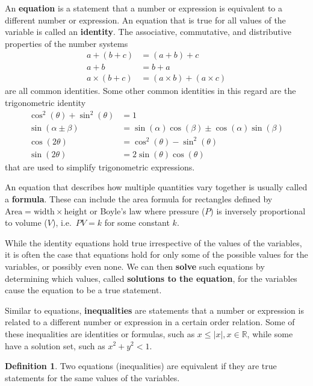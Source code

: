 \documentclass[
]{book}
\theoremstyle{definition}
\newtheorem{definition}{Definition}[chapter]
\theoremstyle{definition}
\theoremstyle{definition}
\theoremstyle{definition}
\theoremstyle{remark}
\begin{document}
An \textbf{equation} is a statement that a number or expression is equivalent to a different number or expression. An equation that is true for all values of the variable is called an \textbf{identity}. The associative, commutative, and distributive properties of the number systems
\begin{align*}
    a+(b+c) &= (a+b)+c \\
    a+b &= b+a \\
    a \times (b+c) &= (a\times b)+(a\times c)
\end{align*}
are all common identities. Some other common identities in this regard are the trigonometric identity
\begin{align*}
    \cos^2(\theta) + \sin^2(\theta) &= 1  \\
    \sin(\alpha \pm \beta) &= \sin(\alpha)\cos(\beta)\pm \cos(\alpha)\sin(\beta) \\
    \cos(2\theta) &= \cos^2(\theta)-\sin^2(\theta) \\
    \sin(2 \theta) &= 2 \sin(\theta)\cos(\theta)
\end{align*}
that are used to simplify trigonometric expressions.

An equation that describes how multiple quantities vary together is usually called a \textbf{formula}. These can include the area formula for rectangles defined by \(\mbox{Area}=\mbox{width} \times \mbox{height}\) or Boyle's law where pressure (\(P\)) is inversely proportional to volume (\(V\)), i.e.~\(PV =k\) for some constant \(k\).

While the identity equations hold true irrespective of the values of the variables, it is often the case that equations hold for only some of the possible values for the variables, or possibly even none. We can then \textbf{solve} such equations by determining which values, called \textbf{solutions to the equation}, for the variables cause the equation to be a true statement.

Similar to equations, \textbf{inequalities} are statements that a number or expression is related to a different number or expression in a certain order relation. Some of these inequalities are identities or formulas, such as \(x\leq |x|, x\in\mathbb{R}\), while some have a solution set, such as \(x^2+y^2<1\).

\begin{definition}
Two equations (inequalities) are equivalent if they are true statements for the same values of the variables.
\end{definition}
\end{document}

